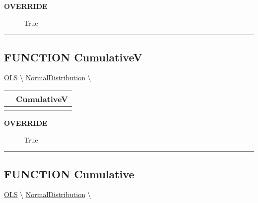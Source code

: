 \par

\par
\begin{description}
\item [\colorbox{tagtype}{\color{white} \textbf{\textsf{OVERRIDE}}}] \textbf{\underline{}} True
\end{description}

\rule{\linewidth}{0.5pt}
\subsection*{\textsf{\colorbox{headtoc}{\color{white} FUNCTION}
CumulativeV}}

\hypertarget{ecldoc:linearregression.ols.distributionbase.cumulativev}{}
\hspace{0pt} \hyperlink{ecldoc:linearregression.ols}{OLS} \textbackslash 
\hspace{0pt} \hyperlink{ecldoc:linearregression.ols.normaldistribution}{NormalDistribution} \textbackslash 

{\renewcommand{\arraystretch}{1.5}
\begin{tabularx}{\textwidth}{|>{\raggedright\arraybackslash}l|X|}
\hline
\hspace{0pt}\mytexttt{\color{red} } & \textbf{CumulativeV} \\
\hline
\multicolumn{2}{|>{\raggedright\arraybackslash}X|}{\hspace{0pt}\mytexttt{\color{param} ()}} \\
\hline
\end{tabularx}
}

\par

\par
\begin{description}
\item [\colorbox{tagtype}{\color{white} \textbf{\textsf{OVERRIDE}}}] \textbf{\underline{}} True
\end{description}

\rule{\linewidth}{0.5pt}
\subsection*{\textsf{\colorbox{headtoc}{\color{white} FUNCTION}
Cumulative}}

\hypertarget{ecldoc:linearregression.ols.distributionbase.cumulative}{}
\hspace{0pt} \hyperlink{ecldoc:linearregression.ols}{OLS} \textbackslash 
\hspace{0pt} \hyperlink{ecldoc:linearregression.ols.normaldistribution}{NormalDistribution} \textbackslash 

